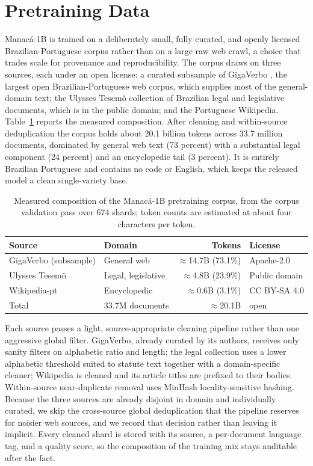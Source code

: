 \documentclass[11pt]{article}
\begin{document}
\section{Pretraining Data}
\label{sec:data}

Manac\'a-1B is trained on a deliberately small, fully curated, and openly licensed
Brazilian-Portuguese corpus rather than on a large raw web crawl, a choice that trades
scale for provenance and reproducibility. The corpus draws on three sources, each under
an open license: a curated subsample of GigaVerbo \cite{tucano}, the largest open
Brazilian-Portuguese web corpus, which supplies most of the general-domain text; the
Ulysses Tesem\~o collection of Brazilian legal and legislative documents, which is in
the public domain; and the Portuguese Wikipedia. Table~\ref{tab:corpus} reports the
measured composition. After cleaning and within-source deduplication the corpus holds
about 20.1 billion tokens across 33.7 million documents, dominated by general web text
(73 percent) with a substantial legal component (24 percent) and an encyclopedic tail
(3 percent). It is entirely Brazilian Portuguese and contains no code or English, which
keeps the released model a clean single-variety base.

\begin{table}[t]
\centering
\caption{Measured composition of the Manac\'a-1B pretraining corpus, from the corpus
validation pass over 674 shards; token counts are estimated at about four characters
per token.}
\label{tab:corpus}
\small
\begin{tabular}{llrl}
\toprule
Source & Domain & Tokens & License \\
\midrule
GigaVerbo (subsample) & General web & $\approx$14.7B (73.1\%) & Apache-2.0 \\
Ulysses Tesem\~o & Legal, legislative & $\approx$4.8B (23.9\%) & Public domain \\
Wikipedia-pt & Encyclopedic & $\approx$0.6B (3.1\%) & CC BY-SA 4.0 \\
\midrule
Total & 33.7M documents & $\approx$20.1B & open \\
\bottomrule
\end{tabular}
\end{table}

Each source passes a light, source-appropriate cleaning pipeline rather than one
aggressive global filter. GigaVerbo, already curated by its authors, receives only
sanity filters on alphabetic ratio and length; the legal collection uses a lower
alphabetic threshold suited to statute text together with a domain-specific cleaner;
Wikipedia is cleaned and its article titles are prefixed to their bodies. Within-source
near-duplicate removal uses MinHash locality-sensitive hashing. Because the three
sources are already disjoint in domain and individually curated, we skip the
cross-source global deduplication that the pipeline reserves for noisier web sources,
and we record that decision rather than leaving it implicit. Every cleaned shard is
stored with its source, a per-document language tag, and a quality score, so the
composition of the training mix stays auditable after the fact.
\end{document}
